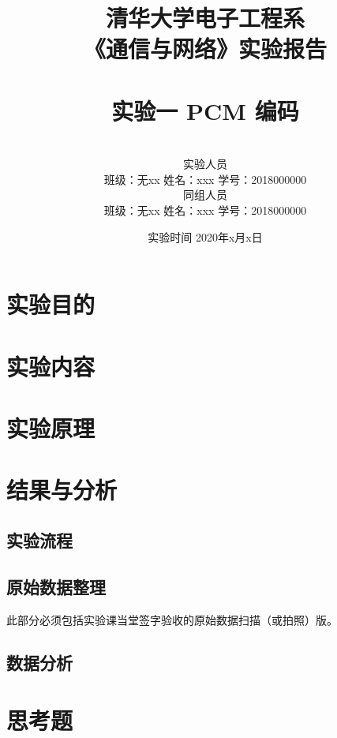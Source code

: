 \documentclass[a4paper]{article}
\begin{document}
\title{
    清华大学电子工程系\\
    \textbf{\huge《通信与网络》实验报告}\\
    ~\\
    实验一\; PCM 编码
}
\author{
    ~\\
    实验人员\\
    班级：无xx \quad 姓名：xxx \quad 学号：2018000000\\
    同组人员\\
    班级：无xx \quad 姓名：xxx \quad 学号：2018000000
}
\date{实验时间 \quad 2020年x月x日}
\maketitle

\thispagestyle{fancy}

\tableofcontents

\section{实验目的}

\section{实验内容}

\section{实验原理}

\section{结果与分析}

\subsection{实验流程}

\subsection{原始数据整理}

此部分必须包括实验课当堂签字验收的原始数据扫描（或拍照）版。

\subsection{数据分析}

\section{思考题}
\end{document}
